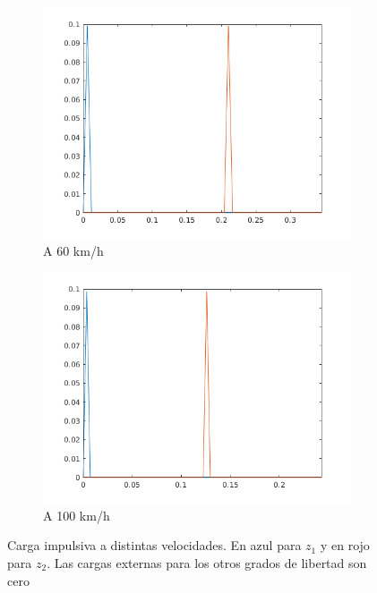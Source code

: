 \documentclass[oneside, a4paper, spanish, links]{amca}
\begin{document}
\begin{figure}[h]
\begin{subfigure}[b]{0.475\textwidth}
        \centering 
        \includegraphics[width=\textwidth]{picos60kmh.png}
        \caption[]%
        {{\small A 60 km/h}}    
    \end{subfigure}
    \quad
    \begin{subfigure}[b]{0.475\textwidth}   
        \centering 
        \includegraphics[width=\textwidth]{picos100kmh.png}
        \caption[]%
        {{\small A 100 km/h}}    
    \end{subfigure}
    \caption[  ]
    {\small Carga impulsiva a distintas velocidades. En azul para $z_1$ y en rojo para $z_2$. Las cargas externas para los otros grados de libertad son cero} 
    \label{fig: impulso dist velocidades}
\end{figure}
\end{document}
